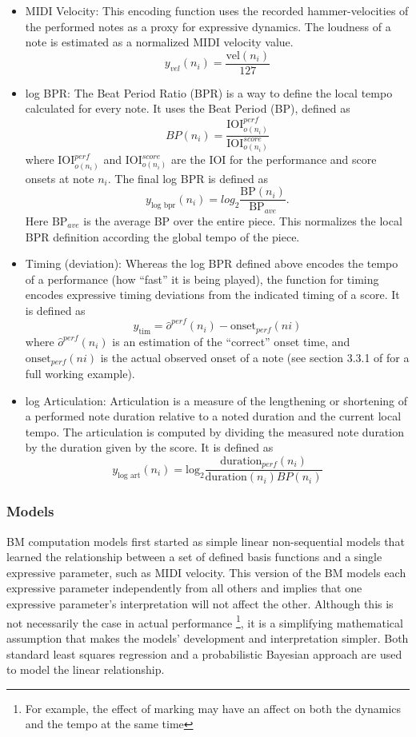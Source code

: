 \newcommand{\iois}{\textrm{IOI}_{o(n_i)}^{score}}
\newcommand{\ioip}{\textrm{IOI}_{o(n_i)}^{perf}}
\begin{itemize}
    \item MIDI Velocity: This encoding function uses the recorded hammer-velocities of the performed notes as a proxy for expressive dynamics. The loudness of a note is estimated as a normalized MIDI velocity value. $$y_{vel}(n_i) = \frac{\textrm{vel}(n_i)}{127}$$
    \item log BPR: The Beat Period Ratio (BPR) is a way to define the local tempo calculated for every note. It uses the Beat Period (BP), defined as $$BP(n_i) = \frac{\ioip}{\iois}$$ where $\ioip$ and $\iois$ are the IOI for the performance and score onsets at note $n_i$. The final log BPR is defined as $$y_{\textrm{log bpr}}(n_i) = log_2\frac{\textrm{BP}(n_i)}{\textrm{BP}_{ave}}.$$ Here $\textrm{BP}_{ave}$ is the average BP over the entire piece. This normalizes the local BPR definition according the global tempo of the piece. 
    \item Timing (deviation): Whereas the log BPR defined above encodes the tempo of a performance (how ``fast'' it is being played), the function for timing encodes expressive timing deviations from the indicated timing of a score. It is defined as $$y_{\textrm{tim}} = \hat{o}^{perf}(n_i) - \textrm{onset}_{perf}(ni)$$ where $\hat{o}^{perf}(n_i)$ is an estimation of the ``correct'' onset time, and $\textrm{onset}_{perf}(ni)$ is the actual observed onset of a note (see section 3.3.1 of \citet{eduardo2018computational} for a full working example). 
    \item log Articulation: Articulation is a measure of the lengthening or shortening of a performed note duration relative to a noted duration and the current local tempo. The articulation is computed by dividing the measured note duration by the duration given by the score. It is defined as $$y_{\textrm{log art}}(n_i) = \textrm{log}_2\frac{\textrm{duration}_{perf}(n_i)}{\textrm{duration}(n_i)BP(n_i)}$$
\end{itemize}

\subsubsection{Models}
BM computation models first started as simple linear non-sequential models that learned the relationship between a set of defined basis functions and a single expressive parameter, such as MIDI velocity. This version of the BM models each expressive parameter independently from all others and implies that one expressive parameter's interpretation will not affect the other. Although this is not necessarily the case in actual performance \footnote{For example, the effect of  marking may have an affect on both the dynamics and the tempo at the same time}, it is a simplifying mathematical assumption that makes the models' development and interpretation simpler. Both standard least squares regression and a probabilistic Bayesian approach are used to model the linear relationship. 

